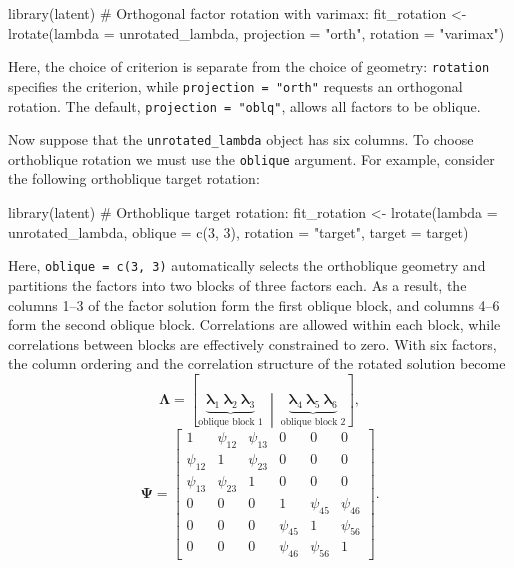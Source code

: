 \documentclass[
  12pt,
  letterpaper,
  article]{scrartcl}
\newenvironment{Shaded}{\begin{snugshade}}{\end{snugshade}}
\newcommand{\AttributeTok}[1]{\textcolor[rgb]{0.40,0.45,0.13}{#1}}
\newcommand{\CommentTok}[1]{\textcolor[rgb]{0.37,0.37,0.37}{#1}}
\newcommand{\DecValTok}[1]{\textcolor[rgb]{0.68,0.00,0.00}{#1}}
\newcommand{\FunctionTok}[1]{\textcolor[rgb]{0.28,0.35,0.67}{#1}}
\newcommand{\NormalTok}[1]{\textcolor[rgb]{0.00,0.23,0.31}{#1}}
\newcommand{\OtherTok}[1]{\textcolor[rgb]{0.00,0.23,0.31}{#1}}
\newcommand{\StringTok}[1]{\textcolor[rgb]{0.13,0.47,0.30}{#1}}
\begin{document}
\begin{Shaded}
\begin{Highlighting}[]
\FunctionTok{library}\NormalTok{(latent)}
\CommentTok{\# Orthogonal factor rotation with varimax:}
\NormalTok{fit\_rotation }\OtherTok{\textless{}{-}} \FunctionTok{lrotate}\NormalTok{(}\AttributeTok{lambda =}\NormalTok{ unrotated\_lambda,}
                        \AttributeTok{projection =} \StringTok{"orth"}\NormalTok{,}
                        \AttributeTok{rotation =} \StringTok{"varimax"}\NormalTok{)}
\end{Highlighting}
\end{Shaded}

Here, the choice of criterion is separate from the choice of geometry:
\texttt{rotation} specifies the criterion, while
\texttt{projection = "orth"} requests an orthogonal rotation. The
default, \texttt{projection = "oblq"}, allows all factors to be oblique.

Now suppose that the \texttt{unrotated\_lambda} object has six columns.
To choose orthoblique rotation we must use the \texttt{oblique}
argument. For example, consider the following orthoblique target
rotation:

\begin{Shaded}
\begin{Highlighting}[]
\FunctionTok{library}\NormalTok{(latent)}
\CommentTok{\# Orthoblique target rotation:}
\NormalTok{fit\_rotation }\OtherTok{\textless{}{-}} \FunctionTok{lrotate}\NormalTok{(}\AttributeTok{lambda =}\NormalTok{ unrotated\_lambda,}
                        \AttributeTok{oblique =} \FunctionTok{c}\NormalTok{(}\DecValTok{3}\NormalTok{, }\DecValTok{3}\NormalTok{),}
                        \AttributeTok{rotation =} \StringTok{"target"}\NormalTok{, }\AttributeTok{target =}\NormalTok{ target)}
\end{Highlighting}
\end{Shaded}

Here, \texttt{oblique = c(3, 3)} automatically selects the orthoblique
geometry and partitions the factors into two blocks of three factors
each. As a result, the columns 1--3 of the factor solution form the
first oblique block, and columns 4--6 form the second oblique block.
Correlations are allowed within each block, while correlations between
blocks are effectively constrained to zero. With six factors, the column
ordering and the correlation structure of the rotated solution become \[
\mathbf{\Lambda}
=\left[
\underbrace{\boldsymbol{\lambda}_1\ \boldsymbol{\lambda}_2\ \boldsymbol{\lambda}_3}
_{\text{oblique block 1}}
\ \middle|\ 
\underbrace{\boldsymbol{\lambda}_4\ \boldsymbol{\lambda}_5\ \boldsymbol{\lambda}_6}
_{\text{oblique block 2}}
\right],
\] \[
\mathbf{\Psi}
=\left[
\begin{array}{ccc|ccc}
1&\psi_{12}&\psi_{13}&0&0&0\\
\psi_{12}&1&\psi_{23}&0&0&0\\
\psi_{13}&\psi_{23}&1&0&0&0\\\hline
0&0&0&1&\psi_{45}&\psi_{46}\\
0&0&0&\psi_{45}&1&\psi_{56}\\
0&0&0&\psi_{46}&\psi_{56}&1
\end{array}
\right].
\]
\end{document}
